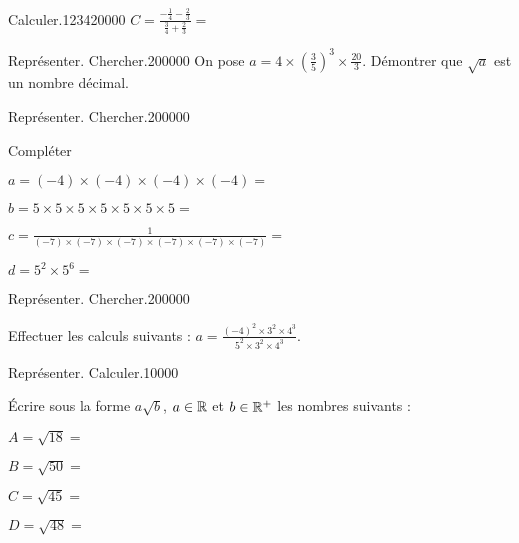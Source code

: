 \begin{pageParcoursu}
\begin{ExoCu}{Calculer.}{1234}{2}{0}{0}{0}{0}
$C = \frac{-\frac{1}{4} -\frac{2}{3}}{\frac{3}{4}+\frac{2}{3}}=$ 
\end{ExoCu}


\begin{ExoCu}{Représenter. Chercher.}{2}{0}{0}{0}{0}{0}
On pose $a=4\times \left(\frac{3}{5}\right)^3 \times \frac{20}{3}$. Démontrer que $\sqrt{a}$ est un nombre décimal.
\end{ExoCu}


\begin{ExoCu}{Représenter. Chercher.}{2}{0}{0}{0}{0}{0}

Compléter \vspace{0.4cm}

\begin{minipage}{0.48\linewidth}
$a= (-4) \times (-4)\times (-4) \times (-4)  =$  
 
$b= 5 \times 5\times 5 \times 5 \times 5\times 5 \times 5  =$  
\end{minipage}
\vrule
\begin{minipage}{0.48\linewidth}
$c= \frac{1}{(-7) \times (-7)\times (-7) \times (-7)\times (-7) \times (-7)}  =$  
 
$d= 5^2 \times 5^6  =$  
\end{minipage}
\end{ExoCu}



\begin{ExoCu}{Représenter. Chercher.}{2}{0}{0}{0}{0}{0}

Effectuer les calculs suivants : $a= \frac{(-4)^2\times 3^2\times 4^3 }{5^2\times 3^2\times 4^3} $.  

\end{ExoCu}

\begin{ExoCuN}{Représenter. Calculer.}{1}{0}{0}{0}{0}

Écrire sous la forme $a\sqrt{b}$, $a\in\mathbb R$ et $b \in \mathbb R^+$ les nombres suivants : \vspace{0.4cm}

\begin{minipage}{0.5\linewidth}
$A = \sqrt{18}=$  

$B=\sqrt{50}=$  

\end{minipage}
\vrule
\begin{minipage}{0.5\linewidth}
$C=\sqrt{45}=$    

$D=\sqrt{48}=$  
\end{minipage}
 
\end{ExoCuN}


 


\end{pageParcoursu} %
 
